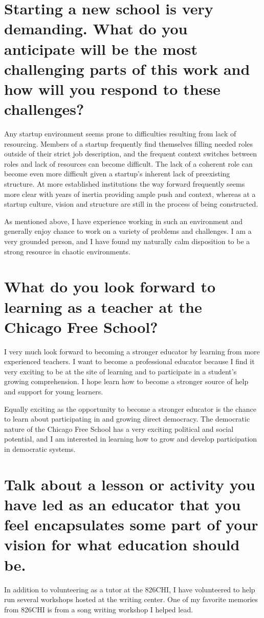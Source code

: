 \documentclass[oneside]{memoir}
\begin{document}
\section*{Starting a new school is very demanding.  What do you
  anticipate will be the most challenging parts of this work and how
  will you respond to these challenges?}
Any startup environment seems prone to difficulties resulting from
lack of resourcing.
Members of a startup frequently find themselves filling needed roles
outside of their strict job description, and the frequent context
switches between roles and lack of resources can become difficult.
The lack of a coherent role can become even more difficult 
given a startup's inherent lack of preexisting structure.
At more established institutions the way forward frequently seems
more clear with years of inertia providing ample push and context,
whereas at a startup culture, vision and structure are still in the
process of being constructed.

As mentioned above, I have experience working in such an environment
and generally enjoy chance to work on a variety of problems and
challenges. 
I am a very grounded person, and I have found my naturally calm
disposition to be a strong resource in chaotic environments.

\section*{What do you look forward to learning as a teacher at the
  Chicago Free School?}
I very much look forward to becoming a stronger educator by learning
from more experienced teachers.
I want to become a professional educator because I find it
very exciting to be at the site of learning and to participate in a
student's growing comprehension.
I hope learn how to become a stronger source of help and support for
young learners.

Equally exciting as the opportunity to become a stronger educator is
the chance to learn about participating in and growing direct
democracy.
The democratic nature of the Chicago Free School has a very exciting
political and social potential, and I am interested in learning how to
grow and develop participation in democratic systems.

\section*{Talk about a lesson or activity you have led as an educator
  that you feel encapsulates some part of your vision for what
  education should be.}
In addition to volunteering as a tutor at the 826CHI, I have
volunteered to help run several workshops hosted at the writing
center.
One of my favorite memories from 826CHI is from a song writing
workshop I helped lead.
\end{document}
